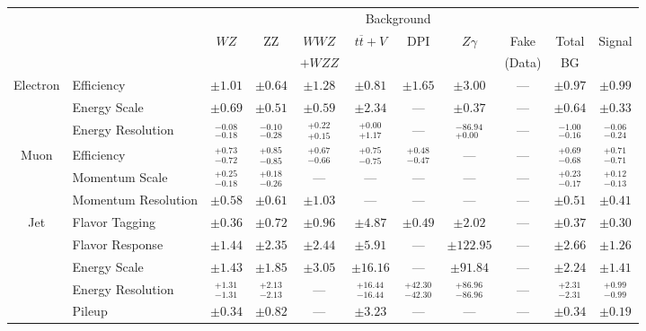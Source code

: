 \small\renewcommand{\tabcolsep}{1pt}
\begin{tabular}{|cl||ccccccc|c||c|}
\hline
 & & \multicolumn{8}{c||}{Background} & \\ 
 & & $WZ$ & ZZ & $WWZ$ & $t\overline{t}+V$ & DPI & $Z\gamma$ & Fake & Total & Signal\\ 
 & & &  & $+WZZ$ &  &  &  & (Data) & BG & \\ 
\hline\hline
\multirow{3}{*}{Electron}
& Efficiency  & $\pm 1.01$  & $\pm 0.64$  & $\pm 1.28$  & $\pm 0.81$  & $\pm 1.65$  & $\pm 3.00$  & ---  & $\pm 0.97$  & $\pm 0.99$ \\ 
\cline{2-11}
& Energy Scale  & $\pm 0.69$  & $\pm 0.51$  & $\pm 0.59$  & $\pm 2.34$  & ---  & $\pm 0.37$  & ---  & $\pm 0.64$  & $\pm 0.33$ \\ 
\cline{2-11}
&Energy Resolution &  $^{-0.08}_{-0.18}$  &  $^{-0.10}_{-0.28}$  &  $^{+0.22}_{+0.15}$  &  $^{+0.00}_{+1.17}$  & --- &  $^{-86.94}_{+0.00}$  & --- &  $^{-1.00}_{-0.16}$  &  $^{-0.06}_{-0.24}$ \\ 
\hline
\multirow{3}{*}{Muon}
&Efficiency &  $^{+0.73}_{-0.72}$  &  $^{+0.85}_{-0.85}$  &  $^{+0.67}_{-0.66}$  &  $^{+0.75}_{-0.75}$  &  $^{+0.48}_{-0.47}$  & --- & --- &  $^{+0.69}_{-0.68}$  &  $^{+0.71}_{-0.71}$ \\ 
\cline{2-11}
&Momentum Scale &  $^{+0.25}_{-0.18}$  &  $^{+0.18}_{-0.26}$  & --- & --- & --- & --- & --- &  $^{+0.23}_{-0.17}$  &  $^{+0.12}_{-0.13}$ \\ 
\cline{2-11}
& Momentum Resolution  & $\pm 0.58$  & $\pm 0.61$  & $\pm 1.03$  & ---  & ---  & ---  & ---  & $\pm 0.51$  & $\pm 0.41$ \\ 
\hline
\multirow{6}{*}{Jet}
& Flavor Tagging  & $\pm 0.36$  & $\pm 0.72$  & $\pm 0.96$  & $\pm 4.87$  & $\pm 0.49$  & $\pm 2.02$  & ---  & $\pm 0.37$  & $\pm 0.30$ \\ 
\cline{2-11}
& Flavor Response  & $\pm 1.44$  & $\pm 2.35$  & $\pm 2.44$  & $\pm 5.91$  & ---  & $\pm 122.95$  & ---  & $\pm 2.66$  & $\pm 1.26$ \\ 
\cline{2-11}
& Energy Scale  & $\pm 1.43$  & $\pm 1.85$  & $\pm 3.05$  & $\pm 16.16$  & ---  & $\pm 91.84$  & ---  & $\pm 2.24$  & $\pm 1.41$ \\ 
\cline{2-11}
&Energy Resolution &  $^{+1.31}_{-1.31}$  &  $^{+2.13}_{-2.13}$  & --- &  $^{+16.44}_{-16.44}$  &  $^{+42.30}_{-42.30}$  &  $^{+86.96}_{-86.96}$  & --- &  $^{+2.31}_{-2.31}$  &  $^{+0.99}_{-0.99}$ \\ 
\cline{2-11}
& Pileup  & $\pm 0.34$  & $\pm 0.82$  & ---  & $\pm 3.23$  & ---  & ---  & ---  & $\pm 0.34$  & $\pm 0.19$ \\ 

\end{tabular}
